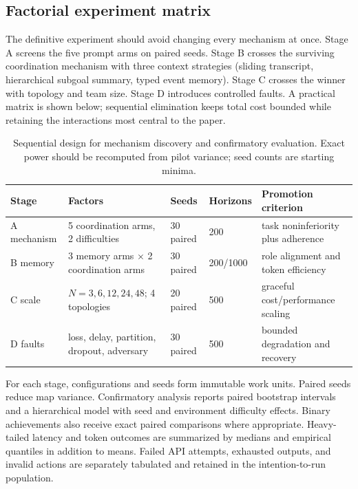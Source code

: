 \documentclass[11pt]{article}
\begin{document}
\subsection{Factorial experiment matrix}
The definitive experiment should avoid changing every mechanism at once. Stage A screens the five prompt arms on paired seeds. Stage B crosses the surviving coordination mechanism with three context strategies (sliding transcript, hierarchical subgoal summary, typed event memory). Stage C crosses the winner with topology and team size. Stage D introduces controlled faults. A practical matrix is shown below; sequential elimination keeps total cost bounded while retaining the interactions most central to the paper.

\begin{table}[h]
\centering\small
\begin{tabularx}{\textwidth}{lXlll}
\toprule
Stage & Factors & Seeds & Horizons & Promotion criterion\\
\midrule
A mechanism & 5 coordination arms, 2 difficulties & 30 paired & 200 & task noninferiority plus adherence\\
B memory & 3 memory arms $\times$ 2 coordination arms & 30 paired & 200/1000 & role alignment and token efficiency\\
C scale & $N=3,6,12,24,48$; 4 topologies & 20 paired & 500 & graceful cost/performance scaling\\
D faults & loss, delay, partition, dropout, adversary & 30 paired & 500 & bounded degradation and recovery\\
\bottomrule
\end{tabularx}
\caption{Sequential design for mechanism discovery and confirmatory evaluation. Exact power should be recomputed from pilot variance; seed counts are starting minima.}
\end{table}

For each stage, configurations and seeds form immutable work units. Paired seeds reduce map variance. Confirmatory analysis reports paired bootstrap intervals and a hierarchical model with seed and environment difficulty effects. Binary achievements also receive exact paired comparisons where appropriate. Heavy-tailed latency and token outcomes are summarized by medians and empirical quantiles in addition to means. Failed API attempts, exhausted outputs, and invalid actions are separately tabulated and retained in the intention-to-run population.
\end{document}
